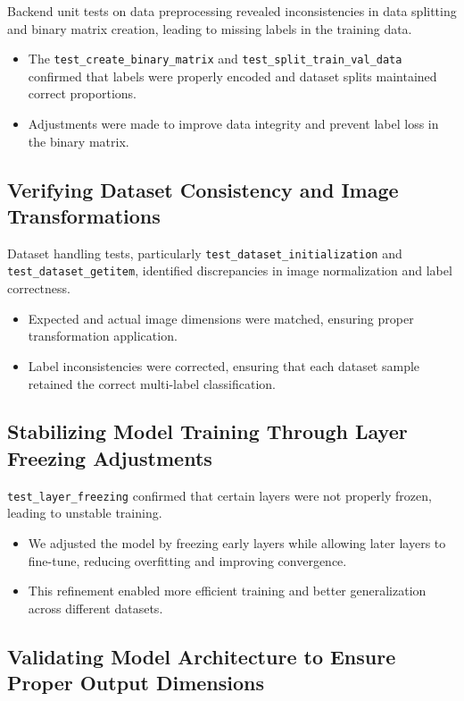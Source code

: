 \documentclass[12pt, titlepage]{article}
\begin{document}
Backend unit tests on data preprocessing revealed inconsistencies in data splitting and binary matrix creation, leading to missing labels in the training data.
\begin{itemize}
    \item The \texttt{test\_create\_binary\_matrix} and \texttt{test\_split\_train\_val\_data} confirmed that labels were properly encoded and dataset splits maintained correct proportions.
    \item Adjustments were made to improve data integrity and prevent label loss in the binary matrix.
\end{itemize}

\subsection{Verifying Dataset Consistency and Image Transformations}

Dataset handling tests, particularly \texttt{test\_dataset\_initialization} and \texttt{test\_dataset\_getitem}, identified discrepancies in image normalization and label correctness.
\begin{itemize}
    \item Expected and actual image dimensions were matched, ensuring proper transformation application.
    \item Label inconsistencies were corrected, ensuring that each dataset sample retained the correct multi-label classification.
\end{itemize}

\subsection{Stabilizing Model Training Through Layer Freezing Adjustments}

\texttt{test\_layer\_freezing} confirmed that certain layers were not properly frozen, leading to unstable training.
\begin{itemize}
    \item We adjusted the model by freezing early layers while allowing later layers to fine-tune, reducing overfitting and improving convergence.
    \item This refinement enabled more efficient training and better generalization across different datasets.
\end{itemize}

\subsection{Validating Model Architecture to Ensure Proper Output Dimensions}
\end{document}
